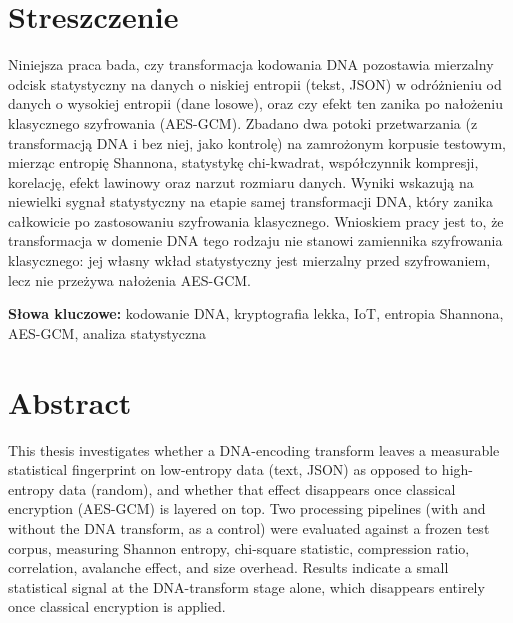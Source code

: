 \documentclass[12pt,a4paper,twoside]{report}
\numberwithin{equation}{chapter}
\begin{document}


\chapter*{Streszczenie}

Niniejsza praca bada, czy transformacja kodowania DNA pozostawia
mierzalny odcisk statystyczny na danych o niskiej entropii (tekst, JSON)
w odróżnieniu od danych o wysokiej entropii (dane losowe), oraz czy
efekt ten zanika po nałożeniu klasycznego szyfrowania (AES-GCM). Zbadano
dwa potoki przetwarzania (z transformacją DNA i bez niej, jako kontrolę)
na zamrożonym korpusie testowym, mierząc entropię Shannona, statystykę
chi-kwadrat, współczynnik kompresji, korelację, efekt lawinowy oraz
narzut rozmiaru danych. Wyniki wskazują na niewielki sygnał statystyczny
na etapie samej transformacji DNA, który zanika całkowicie po
zastosowaniu szyfrowania klasycznego. Wnioskiem pracy jest to, że
transformacja w domenie DNA tego rodzaju nie stanowi zamiennika
szyfrowania klasycznego: jej własny wkład statystyczny jest mierzalny
przed szyfrowaniem, lecz nie przeżywa nałożenia AES-GCM.

\textbf{Słowa kluczowe:} kodowanie DNA, kryptografia lekka, IoT,
entropia Shannona, AES-GCM, analiza statystyczna

\chapter*{Abstract}

This thesis investigates whether a DNA-encoding transform leaves a
measurable statistical fingerprint on low-entropy data (text, JSON) as
opposed to high-entropy data (random), and whether that effect
disappears once classical encryption (AES-GCM) is layered on top. Two
processing pipelines (with and without the DNA transform, as a control)
were evaluated against a frozen test corpus, measuring Shannon entropy,
chi-square statistic, compression ratio, correlation, avalanche effect,
and size overhead. Results indicate a small statistical
signal at the DNA-transform stage alone, which disappears entirely once
classical encryption is applied.
\end{document}
